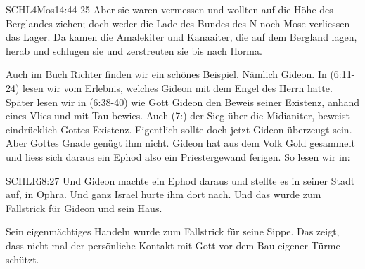 \documentclass[14pt]{../../inc/mybib}
\newenvironment{block}[1][]{%
  \vspace{1.5em}%
  \noindent\textbf{#1}\par%
  \vspace{0.0em}%
}{%
  \vspace{1em}%
}
\begin{document}
\begin{bibelbox}{SCHL}{4Mos}{14:44-25}
        Aber sie waren vermessen und wollten auf die Höhe des Berglandes ziehen; doch weder die Lade des Bundes des \herr N noch Mose verliessen das Lager. Da kamen die Amalekiter und Kanaaiter, die auf dem Bergland lagen, herab und schlugen sie und zerstreuten sie bis nach Horma.
    \end{bibelbox} 
\begin{block}
    Auch im Buch Richter finden wir ein schönes Beispiel. Nämlich Gideon. In (6:11-24) lesen wir vom Erlebnis, welches Gideon mit dem Engel des Herrn hatte. Später lesen wir in (6:38-40) wie Gott Gideon den Beweis seiner Existenz, anhand eines Vlies und mit Tau bewies. Auch (7:) der Sieg über die Midianiter, beweist eindrücklich Gottes Existenz. Eigentlich sollte doch jetzt Gideon überzeugt sein. Aber Gottes Gnade genügt ihm nicht. Gideon hat aus dem Volk Gold gesammelt und liess sich daraus ein Ephod also ein Priestergewand ferigen. So lesen wir in:
    \begin{bibelbox}{SCHL}{Ri}{8:27}
        Und Gideon machte ein Ephod daraus und stellte es in seiner Stadt auf, in Ophra. Und ganz Israel hurte ihm dort nach. Und das wurde zum Fallstrick für Gideon und sein Haus.
    \end{bibelbox} 
    Sein eigenmächtiges Handeln wurde zum Fallstrick für seine Sippe. Das zeigt, dass nicht mal der persönliche Kontakt mit Gott vor dem Bau eigener Türme schützt.
\end{block}
\end{document}
